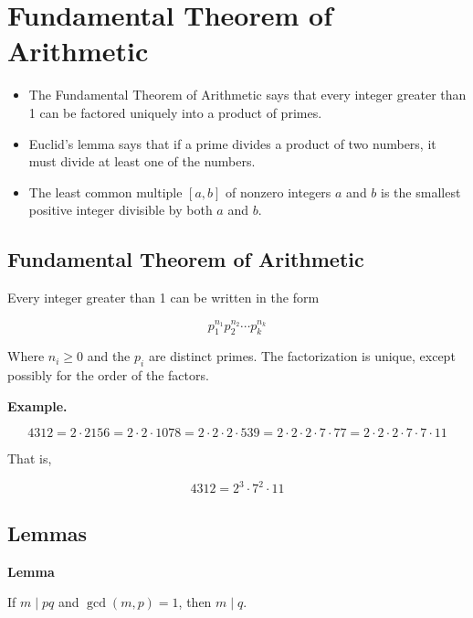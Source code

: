 \newpage
\section{Fundamental Theorem of Arithmetic}

\begin{itemize}

	\item The Fundamental Theorem of Arithmetic says that every integer greater than 1 can be factored 
		 uniquely into a product of primes.
	
	\item Euclid’s lemma says that if a prime divides a product of two numbers, it must divide at least 
		  one of the numbers.
	
	\item The least common multiple \([a, b]\) of nonzero integers \(a\) and \(b\) is the smallest positive 
	      integer divisible by both \(a\) and \(b\).

\end{itemize}

\subsection{Fundamental Theorem of Arithmetic}

Every integer greater than 1 can be written in the form

\[
	p_1^{n_1}p_2^{n_2} \cdots p_k^{n_k}
\]

Where \(n_i \geq 0\) and the \(p_i\) are distinct primes. The factorization is unique, except possibly for 
the order of the factors.
\vspace{\baselineskip}

\textbf{Example.}

\[
	4312 = 2 \cdot 2156 = 2 \cdot 2 \cdot 1078 = 2 \cdot 2 \cdot 2 \cdot 539 = 2 \cdot 2 \cdot 2 \cdot 7 
	\cdot 77 = 2 \cdot 2 \cdot 2 \cdot 7 \cdot 7 \cdot 11
\]

That is,

\[
	4312 = 2^3 \cdot 7^2 \cdot 11
\]

\subsection{Lemmas}

\textbf{Lemma} 

If \(m \mid pq\) and \(\gcd(m, p) = 1\), then \(m \mid q\).
\vspace{\baselineskip}

